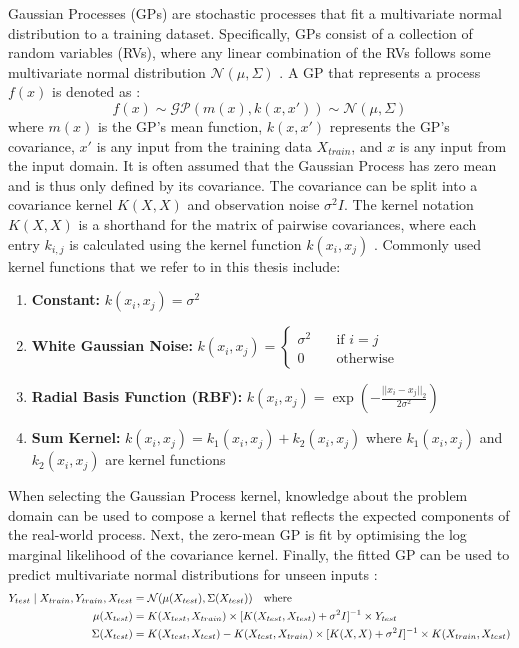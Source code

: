 Gaussian Processes (GPs) are stochastic processes that fit a multivariate normal distribution to a training dataset. Specifically, GPs consist of a collection of random variables (RVs), where any linear combination of the RVs follows some multivariate normal distribution $\mathcal{N}(\mu, \Sigma)$ \cite{gp-ml-2005}. A GP that represents a process $f(x)$ is denoted as \cite{gp-ml-2005}:
\begin{equation*}
    f(x) \sim \mathcal{GP}(m(x), k(x, x')) \sim \mathcal{N}(\mu, \Sigma)
\end{equation*}
where $m(x)$ is the GP's mean function, $k(x, x')$ represents the GP's covariance, $x'$ is any input from the training data $X_{train}$, and $x$ is any input from the input domain. It is often assumed that the Gaussian Process has zero mean and is thus only defined by its covariance. The covariance can be split into a covariance kernel $K(X, X)$ and observation noise $\sigma^2 I$. The kernel notation $K(X, X)$ is a shorthand for the matrix of pairwise covariances, where each entry $k_{i,j}$ is calculated using the kernel function $k(x_i, x_j)$ \cite{rio-2019}. Commonly used kernel functions that we refer to in this thesis include:
\begin{enumerate}
    \item \textbf{Constant:} $k(x_i, x_j) = \sigma^2$
    \item \textbf{White Gaussian Noise:} $k(x_i, x_j) = \begin{cases}
        \sigma^2 &\quad \text{if } i = j \\
        0 &\quad \text{otherwise}
    \end{cases}$
    \item \textbf{Radial Basis Function (RBF):} $k(x_i, x_j) = \exp{\left( -\frac{||x_i - x_j||_2}{2 \sigma^2} \right)}$
    \item \textbf{Sum Kernel:} $k(x_i, x_j) = k_1(x_i, x_j) + k_2(x_i, x_j)$ where $k_1(x_i, x_j)$ and $k_2(x_i, x_j)$ are kernel functions
\end{enumerate}
\noindent When selecting the Gaussian Process kernel, knowledge about the problem domain can be used to compose a kernel that reflects the expected components of the real-world process. Next, the zero-mean GP is fit by optimising the log marginal likelihood of the covariance kernel. Finally, the fitted GP can be used to predict multivariate normal distributions for unseen inputs \cite{gp-ml-2005}:
\begin{equation*}
    \begin{split}
        Y_{test} \mathrel{|} X_{train}, Y_{train}, X_{test} &= \mathcal{N}(\mu(X_{test}), \Sigma(X_{test})) \quad \text{where} \\
        \mu(X_{test}) &= K(X_{test}, X_{train}) \times [K(X_{test}, X_{test}) + \sigma^2 I]^{-1} \times Y_{test} \\
        \Sigma(X_{test}) &= K(X_{test}, X_{test}) - K(X_{test}, X_{train}) \times [K(X, X) + \sigma^2 I]^{-1} \times K(X_{train}, X_{test})
    \end{split}
\end{equation*}
